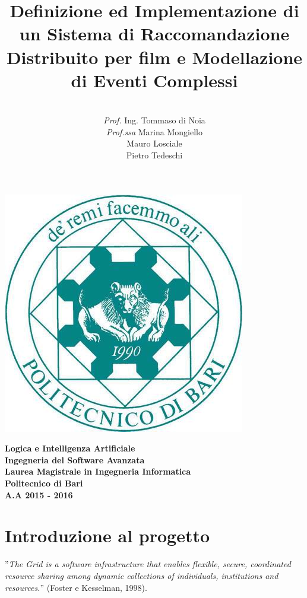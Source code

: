 \documentclass[11pt]{article}
\date{}
\begin{document}
\title{\textbf{Definizione ed Implementazione di un Sistema di Raccomandazione Distribuito per film
		e Modellazione di Eventi Complessi}}

\author{\\\textit{Prof.} Ing. Tommaso di Noia\\\textit{Prof.ssa} Marina Mongiello \\
	Mauro Losciale\\ 
	Pietro Tedeschi\\}

\clearpage\maketitle
\thispagestyle{empty}

\begin{center}
	\includegraphics[scale=0.40]{images/poliba.jpg}
\end{center}

{\textbf{\center Logica e Intelligenza Artificiale\\Ingegneria del Software Avanzata\\ Laurea Magistrale in Ingegneria Informatica\\Politecnico di Bari\\A.A 2015 - 2016\\}}

\newpage
\clearpage
\thispagestyle{empty}
\renewcommand\contentsname{Indice}
\tableofcontents
\newpage
\setcounter{page}{1}
\section{Introduzione al progetto}
''\emph{The Grid is a software infrastructure that enables flexible, secure, coordinated resource sharing among dynamic collections of individuals, institutions and resources.}'' (Foster e Kesselman, 1998).
\end{document}
